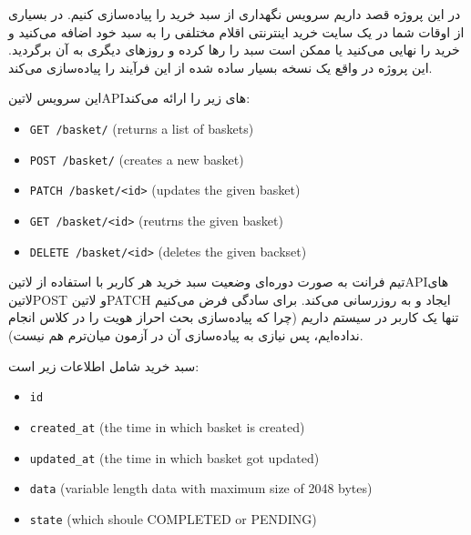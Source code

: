 
در این پروژه قصد داریم سرویس نگهداری از سبد خرید را پیاده‌سازی کنیم. در بسیاری از اوقات شما در یک سایت خرید
اینترنتی اقلام مختلفی را به سبد خود اضافه می‌کنید و خرید را نهایی می‌کنید یا ممکن است سبد را رها کرده و روزهای دیگری
به آن برگردید. این پروژه در واقع یک نسخه بسیار ساده شده از این فرآیند را پیاده‌سازی می‌کند.


این سرویس ‌لاتین{API}های زیر را ارائه می‌کند:


\begin{latin}
  \begin{itemize}
    \item \verb|GET /basket/| (returns a list of baskets)
    \item \verb|POST /basket/| (creates a new basket)
    \item \verb|PATCH /basket/<id>| (updates the given basket)
    \item \verb|GET /basket/<id>| (reutrns the given basket)
    \item \verb|DELETE /basket/<id>| (deletes the given backset)
  \end{itemize}
\end{latin}

تیم فرانت به صورت دوره‌ای وضعیت سبد خرید هر کاربر با استفاده از ‌لاتین{API}های ‌لاتین{POST} و ‌لاتین{PATCH} ایجاد و به روزرسانی می‌کند.
برای سادگی فرض می‌کنیم تنها یک کاربر در سیستم داریم (چرا که پیاده‌سازی بحث احراز هویت را در کلاس انجام نداده‌ایم، پس نیازی به پیاده‌سازی آن در آزمون میان‌ترم هم نیست).



سبد خرید شامل اطلاعات زیر است:

\begin{latin}
  \begin{itemize}
    \item \verb|id|
    \item \verb|created_at| (the time in which basket is created)
    \item \verb|updated_at| (the time in which basket got updated)
    \item \verb|data| (variable length data with maximum size of 2048 bytes)
    \item \verb|state| (which shoule COMPLETED or PENDING)
  \end{itemize}
\end{latin}

